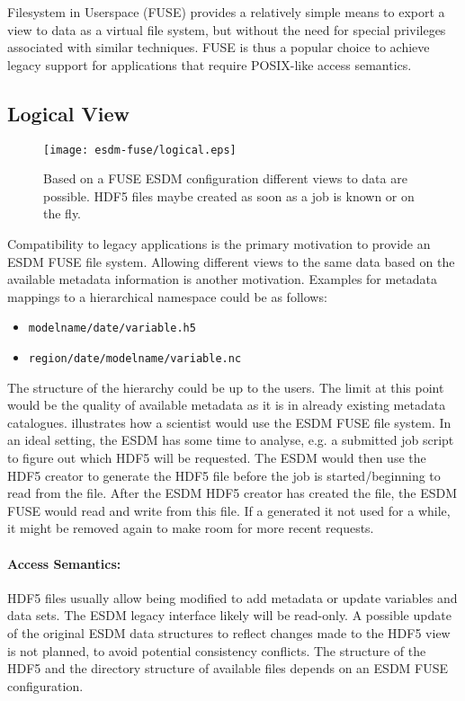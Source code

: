 
Filesystem in Userspace (FUSE) provides a relatively simple means to export a view to data as a virtual file system, but without the need for special privileges associated with similar techniques. FUSE is thus a popular choice to achieve legacy support for applications that require POSIX-like access semantics.


\subsection{Logical View}

\begin{figure}
	\centering
	\texttt{[image: esdm-fuse/logical.eps]}
	\caption{Based on a FUSE ESDM configuration different views to data are possible. HDF5 files maybe created as soon as a job is known or on the fly.}
	\label{fig:esdm fuse logical view}
\end{figure}

Compatibility to legacy applications is the primary motivation to provide an ESDM FUSE  file system.
Allowing different views to the same data based on the available metadata information is another motivation.
Examples for  metadata mappings to a hierarchical namespace could be as follows:

\begin{itemize}
	\item  \texttt{modelname/date/variable.h5}
	\item  \texttt{region/date/modelname/variable.nc}
\end{itemize}

The structure of the hierarchy could be up to the users.
The limit at this point would be the quality of available metadata as it is in already existing metadata catalogues.
 illustrates how a scientist would use the ESDM FUSE file system.
In an ideal setting, the ESDM has some time to analyse, e.g. a submitted job script to figure out which HDF5 will be requested.
The ESDM would then use the HDF5 creator to generate the HDF5 file before the job is started/beginning to read from the file.
After the ESDM HDF5 creator has created the file, the ESDM FUSE would read and write from this file.
If a generated it not used for a while, it might be removed again to make room for more recent requests.


\paragraph{Access Semantics:}
HDF5 files usually allow being modified to add metadata or update variables and data sets.
The ESDM legacy interface likely will be read-only.
A possible update of the original ESDM data structures to reflect changes made to the HDF5 view is not planned, to avoid potential consistency conflicts.
The structure of the HDF5 and the directory structure of available files depends on an ESDM FUSE configuration.



